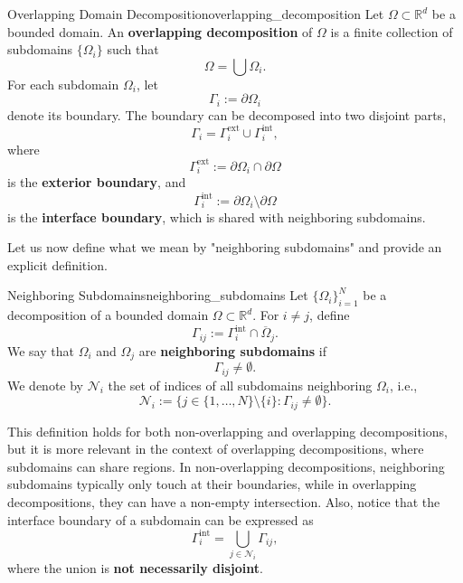 \documentclass[a4paper, 11pt]{article}
\theoremstyle{remark}
\begin{document}
\begin{definition}{Overlapping Domain Decomposition}{overlapping_decomposition}
Let $\Omega \subset \mathbb{R}^d$ be a bounded domain. An \textbf{overlapping decomposition} of $\Omega$ is a finite collection of subdomains $\{\Omega_{i}\}$ such that
\begin{equation*}
    \Omega = \bigcup\Omega_{i}.
\end{equation*}
For each subdomain $\Omega_i$, let
\begin{equation*}
    \Gamma_{i} := \partial \Omega_i
\end{equation*}
denote its boundary. The boundary can be decomposed into two disjoint parts, 
\begin{equation*}
    \Gamma_{i} = \Gamma_{i}^{\text{ext}} \cup \Gamma_{i}^{\text{int}},
\end{equation*}
where
\begin{equation*}
    \Gamma_{i}^{\text{ext}} := \partial \Omega_i \cap \partial \Omega
\end{equation*}
is the \textbf{exterior boundary}, and
\begin{equation*}
    \Gamma_{i}^{\text{int}} := \partial \Omega_{i} \setminus \partial\Omega
\end{equation*}
is the \textbf{interface boundary}, which is shared with neighboring subdomains.
\end{definition}
\noindent Let us now define what we mean by "neighboring subdomains" and provide an explicit definition.
\begin{definition}{Neighboring Subdomains}{neighboring_subdomains}
Let $\{\Omega_i\}_{i=1}^N$ be a decomposition of a bounded domain $\Omega \subset \mathbb{R}^d$. For $i \neq j$, define 
\begin{equation*}
    \Gamma_{ij} := \Gamma_i^{\text{int}} \cap \overline{\Omega}_j.
\end{equation*}
We say that $\Omega_i$ and $\Omega_j$ are \textbf{neighboring subdomains} if
\begin{equation*}
    \Gamma_{ij} \neq \emptyset.
\end{equation*}
We denote by $\mathcal{N}_i$ the set of indices of all subdomains neighboring $\Omega_{i}$, i.e.,
\begin{equation*}
    \mathcal{N}_i := \{ j \in \{1, \dots, N\} \setminus \{i\} : \Gamma_{ij} \neq \emptyset \}.
\end{equation*}
\end{definition}
This definition holds for both non-overlapping and overlapping decompositions, but it is more relevant in the context of overlapping decompositions, 
where subdomains can share regions. In non-overlapping decompositions, neighboring subdomains typically only touch at their boundaries, while in 
overlapping decompositions, they can have a non-empty intersection. Also, notice that the interface boundary of a subdomain can be expressed as
\begin{equation*}
    \Gamma_{i}^{\text{int}} = \bigcup_{j \in \mathcal{N}_i} \Gamma_{ij},
\end{equation*}
where the union is \textbf{not necessarily disjoint}. 
\end{document}
